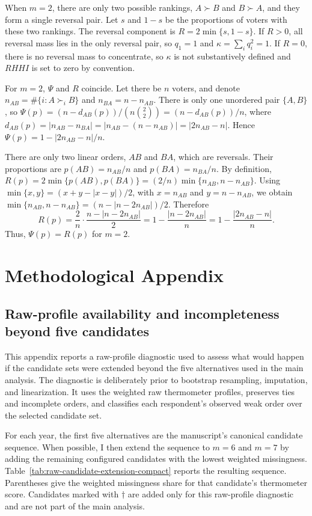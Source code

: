 \documentclass[12pt]{article}
\begin{document}
When \(m=2\), there are only two possible rankings, \(A\succ B\) and
\(B\succ A\), and they form a single reversal pair. Let \(s\) and \(1-s\) be
the proportions of voters with these two rankings. The reversal component is
\(R=2\min\{s,1-s\}\). If \(R>0\), all reversal mass lies in the only reversal
pair, so \(q_1=1\) and \(\kappa=\sum_i q_i^2=1\). If \(R=0\), there is no
reversal mass to concentrate, so \(\kappa\) is not substantively defined and
\(RHHI\) is set to zero by convention.

For \(m=2\), \(\Psi\) and \(R\) coincide. Let there be \(n\) voters, and denote
\(n_{AB}=\#\{i:A\succ_i B\}\) and \(n_{BA}=n-n_{AB}\). There is only one unordered
pair \(\{A,B\}\), so \(\Psi(p)=(n-d_{AB}(p))/(n\binom{2}{2})=(n-d_{AB}(p))/n\), where
\(d_{AB}(p)=|n_{AB}-n_{BA}|=|n_{AB}-(n-n_{AB})|=|2n_{AB}-n|\). Hence
\(\Psi(p)=1-|2n_{AB}-n|/n\).

There are only two linear orders, \(AB\) and \(BA\), which are reversals. Their
proportions are \(p(AB)=n_{AB}/n\) and \(p(BA)=n_{BA}/n\). By definition,
\(R(p)=2\min\{p(AB),p(BA)\}=(2/n)\min\{n_{AB},n-n_{AB}\}\). Using
\(\min\{x,y\}=(x+y-|x-y|)/2\), with \(x=n_{AB}\) and \(y=n-n_{AB}\), we obtain
\(\min\{n_{AB},n-n_{AB}\}=(n-|n-2n_{AB}|)/2\). Therefore
\[
R(p)
=
\frac{2}{n}\cdot\frac{n-|n-2n_{AB}|}{2}
=
1-\frac{|n-2n_{AB}|}{n}
=
1-\frac{|2n_{AB}-n|}{n}.
\]
Thus, \(\Psi(p)=R(p)\) for \(m=2\).

\section{Methodological Appendix}

\subsection{Raw-profile availability and incompleteness beyond five candidates}
\label{app:raw-profile-availability}

This appendix reports a raw-profile diagnostic used to assess what would happen
if the candidate sets were extended beyond the five alternatives used in the
main analysis. The diagnostic is deliberately prior to bootstrap resampling,
imputation, and linearization. It uses the weighted raw thermometer profiles,
preserves ties and incomplete orders, and classifies each respondent's observed
weak order over the selected candidate set.

For each year, the first five alternatives are the manuscript's canonical
candidate sequence. When possible, I then extend the sequence to \(m=6\) and
\(m=7\) by adding the remaining configured candidates with the lowest weighted
missingness. Table~\ref{tab:raw-candidate-extension-compact} reports the
resulting sequence. Parentheses give the weighted missingness share for that
candidate's thermometer score. Candidates marked with \(\dagger\) are added
only for this raw-profile diagnostic and are not part of the main analysis.
\end{document}
